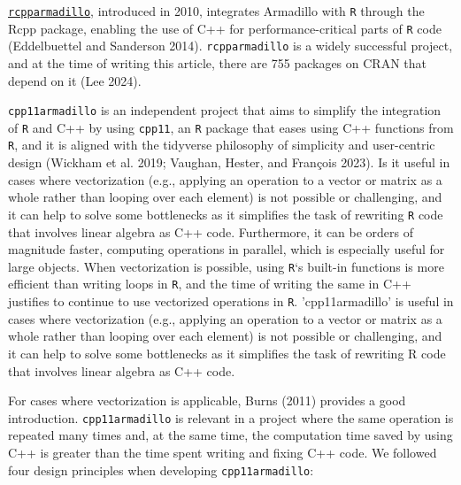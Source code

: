 \href{https://cran.r-project.org/package=RcppArmadillo}{\texttt{rcpparmadillo}},
introduced in 2010, integrates Armadillo with \texttt{R} through the Rcpp package,
enabling the use of C++ for performance-critical parts of \texttt{R} code
(Eddelbuettel and Sanderson 2014). \texttt{rcpparmadillo} is a widely successful project, and at the
time of writing this article, there are 755 packages on CRAN that
depend on it (Lee 2024).

\texttt{cpp11armadillo} is an independent project that aims to simplify the integration of
\texttt{R} and C++ by using \texttt{cpp11}, an \texttt{R} package that eases using C++ functions
from \texttt{R}, and it is aligned with the tidyverse philosophy of simplicity and
user-centric design (Wickham et al. 2019; Vaughan, Hester, and François 2023). Is it useful in cases where
vectorization (e.g., applying an operation to a vector or matrix as a whole
rather than looping over each element) is not possible or challenging, and it
can help to solve some bottlenecks as it simplifies the task of rewriting \texttt{R}
code that involves linear algebra as C++ code. Furthermore, it can be orders of
magnitude faster, computing operations in parallel, which is especially useful
for large objects. When vectorization is possible, using \texttt{R}`s built-in
functions is more efficient than writing loops in \texttt{R}, and the time of writing
the same in C++ justifies to continue to use vectorized operations in \texttt{R}.
'cpp11armadillo' is useful in cases where vectorization (e.g., applying an
operation to a vector or matrix as a whole rather than looping over each
element) is not possible or challenging, and it can help to solve some
bottlenecks as it simplifies the task of rewriting R code that involves linear
algebra as C++ code.

For cases where vectorization is applicable, Burns (2011) provides a good
introduction. \texttt{cpp11armadillo} is relevant in a project where the same operation
is repeated many times and, at the same time, the computation time saved by
using C++ is greater than the time spent writing and fixing C++ code.
We followed four design principles when developing \texttt{cpp11armadillo}:

